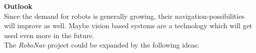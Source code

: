 \textbf{Outlook}\\
Since the demand for robots is generally growing, their navigation-possibilities will improve as well. Maybe vision based systems are a technology which will get used even more in the future. \\
The \textit{RoboNav} project could be expanded by the following ideas:
